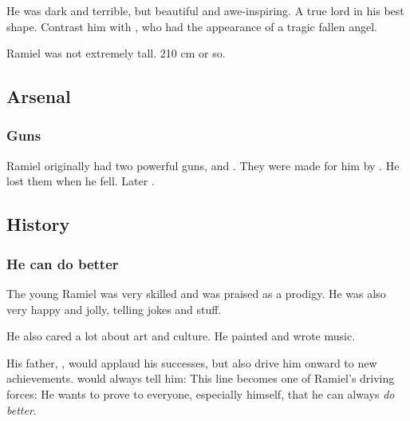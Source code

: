 He was dark and terrible, but beautiful and awe-inspiring. 
A true \sathariah{} lord in his best shape. 
Contrast him with , who had the appearance of a tragic fallen angel.

Ramiel was not extremely tall. 210 cm or so. 









\subsection{Arsenal}





\subsubsection{Guns}
\index{\Currah}
\index{\Strith}
Ramiel originally had two powerful guns, \Strith{} and \Currah. 
They were made for him by \Lyorith. 
He lost them when he fell. 
Later . 









\subsection{History}
\subsubsection{He can do better}
The young Ramiel was very skilled and was praised as a prodigy. 
He was also very happy and jolly, telling jokes and stuff. 

He also cared a lot about art and culture. 
He painted and wrote music. 

His father, \Nathrach{}, would applaud his successes, but also drive him onward to new achievements. 
\Nathrach{} would always tell him: 
This line becomes one of Ramiel's driving forces: 
He wants to prove to everyone, especially himself, that he can always \emph{do better}. 





